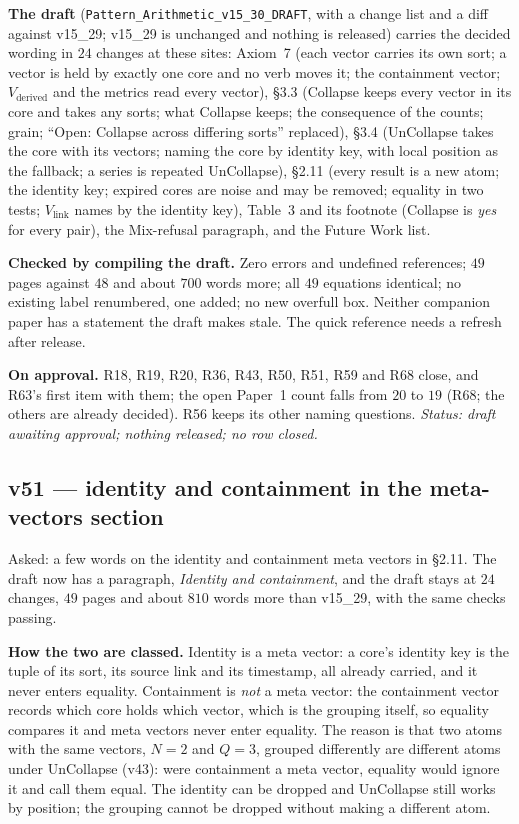 \documentclass[11pt]{article}
\begin{document}
\textbf{The draft} (\texttt{Pattern\_Arithmetic\_v15\_30\_DRAFT}, with a change list and a diff against v15\_29; v15\_29 is unchanged and nothing is released) carries the decided wording in $24$ changes at these sites: Axiom~7 (each vector carries its own sort; a vector is held by exactly one
core and no verb moves it; the containment vector; $V_{\text{derived}}$ and the metrics read every vector), \S3.3 (Collapse keeps every vector in its core and takes any sorts; what Collapse keeps; the consequence of the counts; grain; ``Open: Collapse across differing sorts'' replaced), \S3.4 (UnCollapse takes the
core with its vectors; naming the core by identity key, with local position as the fallback; a series is repeated UnCollapse), \S2.11 (every result is a new atom; the identity key; expired cores are noise and may be removed; equality in two tests; $V_{\text{link}}$ names by the identity key), Table~3 and its footnote
(Collapse is \emph{yes} for every pair), the Mix-refusal paragraph, and the Future Work list.

\textbf{Checked by compiling the draft.} Zero errors and undefined references; $49$ pages against $48$ and about $700$ words more; all $49$ equations identical; no existing label renumbered, one added; no new overfull box. Neither companion paper has a statement the draft makes stale. The quick reference needs a refresh after release.

\textbf{On approval.} R18, R19, R20, R36, R43, R50, R51, R59 and R68 close, and R63's first item with them; the open Paper~1 count falls from $20$ to $19$ (R68; the others are already decided). R56 keeps its other naming questions.
\emph{Status: draft awaiting approval; nothing released; no row closed.}


\subsection*{v51 --- identity and containment in the meta-vectors section}
Asked: a few words on the identity and containment meta vectors in \S2.11. The draft now has a paragraph, \emph{Identity and containment}, and the draft stays at $24$ changes, $49$ pages and about $810$ words more than v15\_29, with the same checks passing.

\textbf{How the two are classed.} Identity is a meta vector: a core's identity key is the tuple of its sort, its source link and its timestamp, all already carried, and it never enters equality. Containment is \emph{not} a meta vector: the containment vector records which core holds which vector, which is the grouping itself, so equality compares it and meta vectors never enter equality.
The reason is that two atoms with the same vectors, $N=2$ and $Q=3$, grouped differently are different atoms under UnCollapse (v43): were containment a meta vector, equality would ignore it and call them equal. The identity can be dropped and UnCollapse still works by position; the grouping cannot be dropped without making a different atom.
\end{document}
